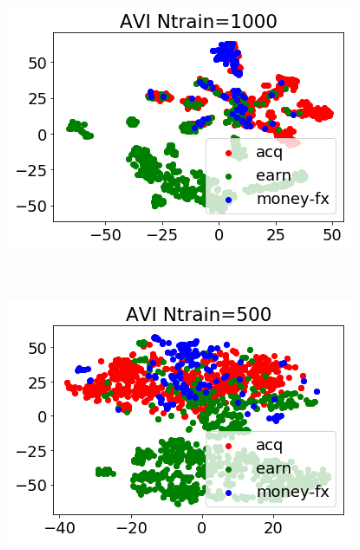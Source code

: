 \documentclass[twoside]{article}
\begin{document}
\begin{figure}
    \centering
    \begin{subfigure}[t]{0.33\textwidth}
        \centering
        \includegraphics[width=1.0\linewidth]{reuters_avi1000.png}
        \label{fig: reuters_h100_avi_1000}
    \end{subfigure}%
    ~
    \begin{subfigure}[t]{0.33\textwidth}
        \centering
        \includegraphics[width=1.0\linewidth]{reuters_avi500.png}
        \label{fig: reuters_h100_avi_500}
    \end{subfigure}%
    ~
    \begin{subfigure}[t]{0.33\textwidth}
        \centering

\end{subfigure}
\end{figure}
\end{document}
